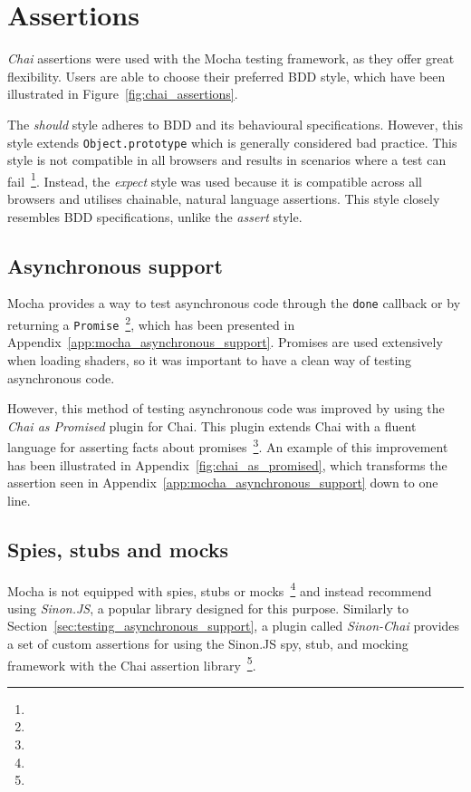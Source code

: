 \section{Assertions} {
\label{sec:assertions}

	\emph{Chai} assertions were used with the Mocha testing framework, as they offer great flexibility. Users are able to choose their preferred BDD style, which have been illustrated in Figure~\ref{fig:chai_assertions}.

	

	The \emph{should} style adheres to BDD and its behavioural specifications. However, this style extends \texttt{Object.prototype} which is generally considered bad practice. This style is not compatible in all browsers and results in scenarios where a test can fail~\footnote{}. Instead, the \emph{expect} style was used because it is compatible across all browsers and utilises chainable, natural language assertions. This style closely resembles BDD specifications, unlike the \emph{assert} style.

	\subsection{Asynchronous support} {
	\label{sec:testing_asynchronous_support}

		Mocha provides a way to test asynchronous code through the \texttt{done} callback or by returning a \texttt{Promise}~\footnote{}, which has been presented in Appendix~\ref{app:mocha_asynchronous_support}. Promises are used extensively when loading shaders, so it was important to have a clean way of testing asynchronous code.

		However, this method of testing asynchronous code was improved by using the \emph{Chai as Promised} plugin for Chai. This plugin extends Chai with a fluent language for asserting facts about promises~\footnote{}. An example of this improvement has been illustrated in Appendix~\ref{fig:chai_as_promised}, which transforms the assertion seen in Appendix~\ref{app:mocha_asynchronous_support} down to one line.

	}

	\subsection{Spies, stubs and mocks} {
	\label{sec:testing_spy_stub_mock_support}

		Mocha is not equipped with spies, stubs or mocks~\footnote{} and instead recommend using \emph{Sinon.JS}, a popular library designed for this purpose. Similarly to Section~\ref{sec:testing_asynchronous_support}, a plugin called \emph{Sinon-Chai} provides a set of custom assertions for using the Sinon.JS spy, stub, and mocking framework with the Chai assertion library~\footnote{}.

	}

}

